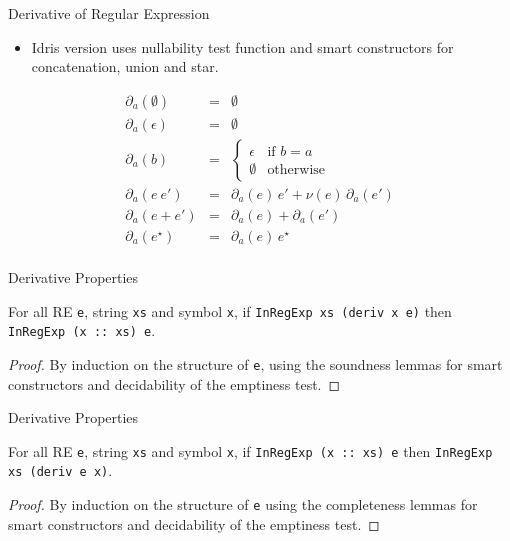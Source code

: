 \documentclass[14pt]{beamer}
\newcommand{\idris}[1]{\texttt{#1}}
\begin{document}
     \begin{frame}{Derivative of Regular Expression}
        \begin{itemize}
           \item Idris version uses nullability test function and smart constructors
                 for concatenation, union and star.
        \end{itemize}
        \[
        \begin{array}{lclr}
          \partial_a(\emptyset) & = & \emptyset\\
          \partial_a(\epsilon) & = & \emptyset \\
          \partial_a(b) & = & \left\{
                              \begin{array}{lr}
                                \epsilon & \text{if } b = a\\
                                \emptyset & \text{otherwise}
                              \end{array}
                                        \right. \\
          \partial_a(e\:e') & = & \partial_a(e)\,e' + \nu(e)\,\partial_a(e')\\
          \partial_a(e + e') & = & \partial_a(e) + \partial_a(e') \\
          \partial_a(e^\star) & = & \partial_a(e)\,e^\star\\
        \end{array}
        \]
     \end{frame}
     \begin{frame}{Derivative Properties}
        \begin{Theorem}\label{derivsound}
        For all RE \idris{e}, string \idris{xs} and symbol \idris{x}, if
        \idris{InRegExp xs (deriv x e)} then \idris{InRegExp (x :: xs) e}.
        \end{Theorem}
        \begin{proof}
          By induction on the structure of \idris{e}, using the soundness
          lemmas for smart constructors and decidability of the emptiness
          test.
        \end{proof}
     \end{frame}
     \begin{frame}{Derivative Properties}
        \begin{Theorem}\label{derivcomplete}
        For all RE \idris{e}, string \idris{xs} and symbol \idris{x}, if
        \idris{InRegExp (x :: xs) e} then \idris{InRegExp xs (deriv e x)}.
        \end{Theorem}
        \begin{proof}
          By induction on the structure of \idris{e} using the completeness
          lemmas for smart constructors and decidability of the emptiness
          test.
        \end{proof}
     \end{frame}
\end{document}
